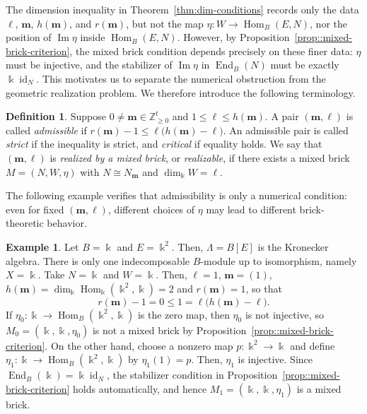 \documentclass[a4,12pt]{amsart}
\numberwithin{equation}{section} %
\def\Hom{\operatorname{Hom}} %
\def\End{\operatorname{End}} %
\def\Im{\operatorname{Im}} %
\theoremstyle{definition} %
\newtheorem{definition}[theorem]{Definition} %
\newtheorem{example}[theorem]{Example} %
\begin{document}
The dimension inequality in Theorem~\ref{thm:dim-conditions} records only the data $\ell$, $\mathbf{m}$, $h(\mathbf{m})$, and $r(\mathbf{m})$, but not the map $\eta\colon W\to\Hom_B(E,N)$, nor the position of $\Im\eta$ inside $\Hom_B(E,N)$. However, by Proposition~\ref{prop::mixed-brick-criterion}, the mixed brick condition depends precisely on these finer data: $\eta$ must be injective, and the stabilizer of $\Im\eta$ in $\End_B(N)$ must be exactly $\Bbbk\operatorname{id}_{N}$. This motivates us to separate the numerical obstruction from the geometric realization problem. We therefore introduce the following terminology.

\begin{definition}
Suppose $0\neq \mathbf{m} \in\mathbb{Z}_{\geq 0}^t$ and $1\leq\ell\leq h(\mathbf{m})$. A pair $(\mathbf{m},\ell)$ is called \emph{admissible} if $r(\mathbf{m})-1\leq \ell\bigl(h(\mathbf{m})-\ell\bigr)$. An admissible pair is called \emph{strict} if the inequality is strict, and \emph{critical} if equality holds. We say that $(\mathbf{m},\ell)$ is \emph{realized by a mixed brick}, or \emph{realizable}, if there exists a mixed brick $M=(N,W,\eta)$ with $N\cong N_{\mathbf{m}}$ and $\dim_{\Bbbk}W=\ell$.
\end{definition}

The following example verifies that admissibility is only a numerical condition: even for fixed $(\mathbf{m},\ell)$, different choices of $\eta$ may lead to different brick-theoretic behavior.
\begin{example}\label{ex::same-data-different-eta}
Let $B=\Bbbk$ and $E=\Bbbk^2$.
Then, $\Lambda=B[E]$ is the Kronecker algebra. There is only one indecomposable $B$-module up to isomorphism, namely $X=\Bbbk$.
Take $N=\Bbbk$ and $W=\Bbbk$. Then, $\ell=1$, $\mathbf{m}=(1)$, $h(\mathbf{m})=\dim_{\Bbbk}\Hom_{\Bbbk}(\Bbbk^2,\Bbbk)=2$ and $r(\mathbf{m})=1$, so that
\[
r(\mathbf{m})-1=0\leq1=\ell\bigl(h(\mathbf{m})-\ell\bigr).
\]
If $\eta_0\colon \Bbbk\to\Hom_B(\Bbbk^2,\Bbbk)$ is the zero map, then $\eta_0$ is not injective, so $M_0=(\Bbbk,\Bbbk,\eta_0)$ is not a mixed brick by Proposition~\ref{prop::mixed-brick-criterion}.
On the other hand, choose a nonzero map $p\colon \Bbbk^2\to\Bbbk$ and define $\eta_1\colon \Bbbk\to\Hom_B(\Bbbk^2,\Bbbk)$ by $\eta_1(1)=p$.
Then, $\eta_1$ is injective. Since $\End_B(\Bbbk)=\Bbbk\operatorname{id}_{N}$, the stabilizer condition in Proposition~\ref{prop::mixed-brick-criterion} holds automatically, and hence $M_1=(\Bbbk,\Bbbk,\eta_1)$ is a mixed brick. 
\end{example}
\end{document}
